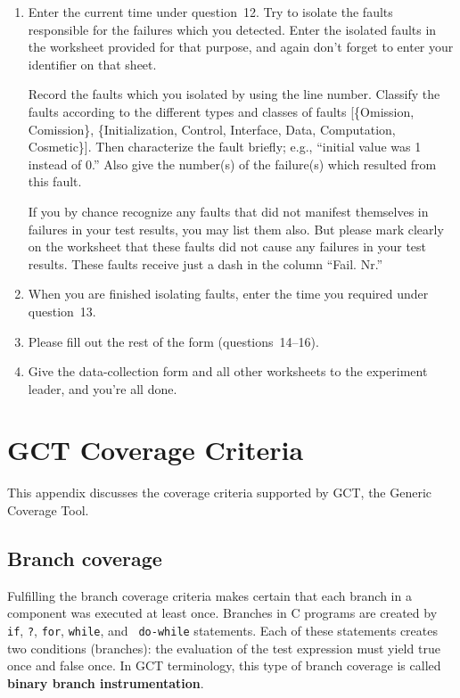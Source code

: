 \begin{enumerate}
\addtocounter{enumi}{17}

\item Enter the current time under question~12.
Try to isolate the faults responsible for the failures which you
detected.
Enter the isolated faults in the worksheet  provided for that purpose,
and again don't forget to enter your identifier on that sheet.

Record the faults which you isolated by using the line number.
Classify the faults according to the different types and classes of
faults [\{Omission, Comission\}, \{Initialization, Control,
Interface, Data, Computation, Cosmetic\}]. 
Then characterize the fault briefly; e.g., ``initial value was 1 instead
of 0.''
Also give the number(s) of the failure(s) which resulted from this fault.

If you by chance recognize any faults that did not manifest themselves
in failures in your test results, you may list them also.  But please
mark clearly on the worksheet that these faults did not cause any
failures in your test results. 
These faults receive just a dash in the column ``Fail. Nr.''

\item When you are finished isolating faults, enter the time you
required under question~13.

\item Please fill out the rest of the form (questions~14--16).

\item Give the data-collection form and all other worksheets to the
experiment leader, and you're all done.

\end{enumerate}

\section*{GCT Coverage Criteria}

This appendix discusses the coverage criteria supported by GCT, the
Generic Coverage Tool.

\subsection*{Branch coverage}

Fulfilling the branch coverage criteria makes certain that each branch
in a component was executed at least once.  Branches in C programs are
created by  {\tt if}, {\tt ?}, {\tt for}, {\tt while}, and {\tt
do-while} statements.  Each of these statements creates two
conditions (branches): the evaluation of the test expression must
yield true once and false once.  In GCT terminology, this type of
branch coverage is called {\bf binary branch instrumentation}.

